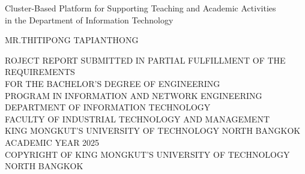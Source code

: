 \newpage
\thispagestyle{empty}
\begin{center}


Cluster-Based Platform for Supporting Teaching and Academic Activities \\
in the Department of Information Technology %


\vspace{80mm}
MR.THITIPONG TAPIANTHONG      %
\vspace{76.5mm}   





ROJECT REPORT SUBMITTED IN PARTIAL FULFILLMENT OF THE REQUIREMENTS \\



FOR THE BACHELOR’S DEGREE OF ENGINEERING\\
PROGRAM IN INFORMATION AND NETWORK ENGINEERING\\

DEPARTMENT OF INFORMATION TECHNOLOGY\\
FACULTY OF INDUSTRIAL TECHNOLOGY AND MANAGEMENT\\
KING MONGKUT’S UNIVERSITY OF TECHNOLOGY NORTH BANGKOK\\
ACADEMIC YEAR 2025\\
COPYRIGHT OF KING MONGKUT’S UNIVERSITY OF TECHNOLOGY NORTH BANGKOK

\end{center}